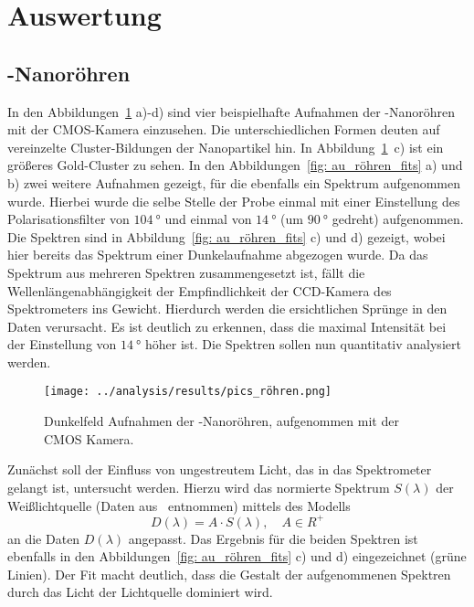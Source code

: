 \section{Auswertung}

\subsection{-Nanoröhren}
\label{sec: auröhren}
In den Abbildungen~\ref{fig: au_röhren_bilder} a)-d) sind vier beispielhafte Aufnahmen der
-Nanoröhren mit der CMOS-Kamera einzusehen. Die unterschiedlichen Formen deuten auf vereinzelte
Cluster-Bildungen der Nanopartikel hin. In Abbildung~\ref{fig: au_röhren_bilder}~c) ist ein größeres Gold-Cluster
zu sehen.
In den Abbildungen~\ref{fig: au_röhren_fits} a) und b) zwei weitere Aufnahmen gezeigt, für die
ebenfalls ein Spektrum aufgenommen wurde. Hierbei wurde die selbe Stelle der
Probe einmal mit einer Einstellung des Polarisationsfilter von $\SI{104}{\degree}$
und einmal von $\SI{14}{\degree}$ (um $\SI{90}{\degree}$ gedreht) aufgenommen.
Die Spektren sind in Abbildung~\ref{fig: au_röhren_fits} c) und d) gezeigt, wobei
hier bereits das Spektrum einer Dunkelaufnahme abgezogen wurde.
Da das Spektrum aus mehreren Spektren zusammengesetzt ist, fällt die Wellenlängenabhängigkeit
der Empfindlichkeit der CCD-Kamera des Spektrometers
ins Gewicht. Hierdurch werden die ersichtlichen Sprünge in den Daten verursacht.
Es ist deutlich zu erkennen, dass
die maximal Intensität bei der Einstellung von $\SI{14}{\degree}$ höher ist.
Die Spektren sollen
nun quantitativ analysiert werden.
\begin{figure}
  \centering
  \texttt{[image: ../analysis/results/pics\_röhren.png]}
  \caption{Dunkelfeld Aufnahmen der -Nanoröhren, aufgenommen mit der CMOS Kamera.}
  \label{fig: au_röhren_bilder}
\end{figure}

Zunächst soll der Einfluss von ungestreutem Licht, das in das Spektrometer gelangt ist, untersucht werden.
Hierzu wird das normierte Spektrum $S(\lambda)$ der Weißlichtquelle (Daten aus~\cite{thorlabs} entnommen)
mittels des Modells
\begin{equation}
  D(\lambda) = A \cdot S(\lambda), \quad A \in R^{+}
  \label{eq: fit_light}
\end{equation}
an die Daten $D(\lambda)$ angepasst. Das Ergebnis für die beiden Spektren ist ebenfalls in den Abbildungen~\ref{fig: au_röhren_fits} c) und d)
eingezeichnet (grüne Linien). Der Fit macht deutlich, dass die Gestalt der aufgenommenen Spektren
durch das Licht der Lichtquelle dominiert wird.

